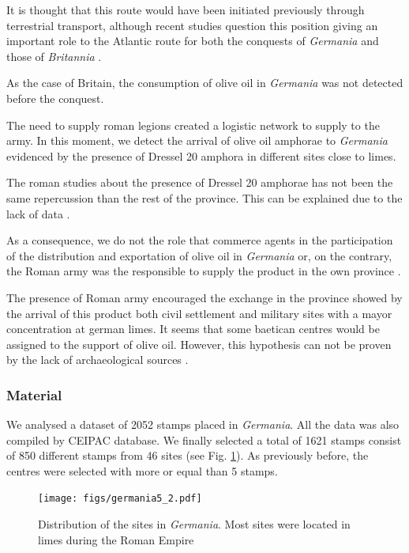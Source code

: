 \documentclass[review]{elsarticle}
\begin{document}
It is thought that this route would have been initiated previously through terrestrial transport, although recent studies question this position giving an important role to the Atlantic route for both the conquests of \textit{Germania} and those of \textit{Britannia} \citep{remesal_germn_2010,rubio-campillo_ecology_2018}.

As the case of Britain, the consumption of olive oil in \textit{Germania} was not detected before the conquest. 

The need to supply roman legions created a logistic network to supply to the army. In this moment, we detect the arrival of olive oil amphorae to \textit{Germania} evidenced by the presence of Dressel 20 amphora in different sites close to limes. 

The roman studies about the presence of Dressel 20 amphorae has not been the same repercussion than the rest of the province. This can be explained due to the lack of data \citep{horacio2010llegada}.  

As a consequence, we do not the role that commerce agents in the participation of the distribution and exportation of olive oil in \textit{Germania} or, on the contrary, the Roman army was the responsible to supply the product in the own province \citep[156]{remesal_germn_2010}. 


The presence of Roman army encouraged the exchange in the province showed by the arrival of this product both civil settlement and military sites with a mayor concentration at german limes. It seems that some baetican centres would be assigned to the support of olive oil. However, this hypothesis can not be proven by the lack of archaeological sources \citep[125]{remesal_concierto}. 


\subsubsection{Material}

We analysed a dataset of 2052 stamps placed in \textit{Germania}. All the data was also compiled by CEIPAC database. We finally selected a total of 1621 stamps consist of 850 different stamps from 46 sites (see Fig. \ref{germania}). As previously before, the centres were selected with more or equal than 5 stamps. 


\begin{figure}[htp]
	\centering
\texttt{[image: figs/germania5\_2.pdf]}
\caption{Distribution of the sites in \textit{Germania}. Most sites were located in limes during the Roman Empire}
\label{germania}
\end{figure}
\end{document}
